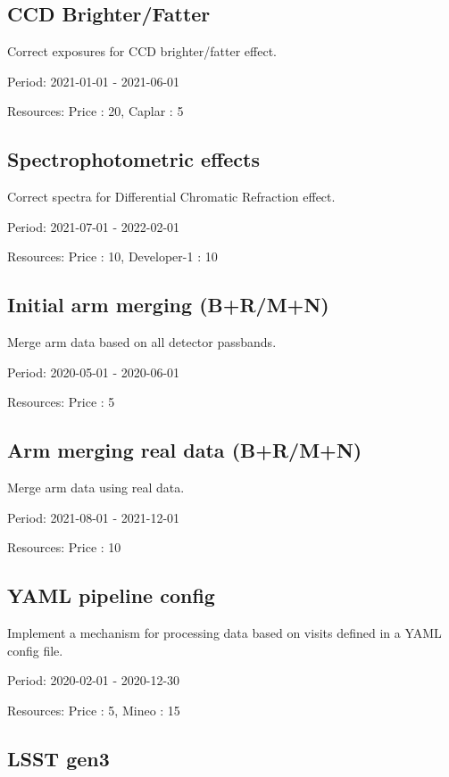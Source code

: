 \subsection{CCD Brighter/Fatter}

Correct exposures for CCD brighter/fatter effect.

Period: 2021-01-01 - 2021-06-01

Resources: Price : 20, Caplar : 5

\subsection{Spectrophotometric effects}

Correct spectra for Differential Chromatic Refraction effect.

Period: 2021-07-01 - 2022-02-01

Resources: Price : 10, Developer-1 : 10

\subsection{Initial arm merging (B+R/M+N)}

Merge arm data based on all detector passbands.

Period: 2020-05-01 - 2020-06-01

Resources: Price : 5

\subsection{Arm merging real data (B+R/M+N)}

Merge arm data using real data.

Period: 2021-08-01 - 2021-12-01

Resources: Price : 10

\subsection{YAML pipeline config}

Implement a mechanism for processing data based on visits defined in a YAML config file.

Period: 2020-02-01 - 2020-12-30

Resources: Price : 5, Mineo : 15

\subsection{LSST gen3}

